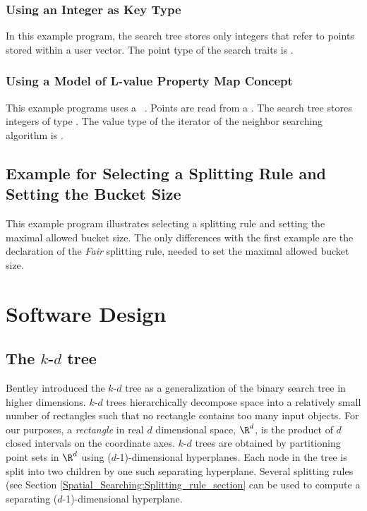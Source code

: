 \subsubsection{Using an Integer as Key Type}
In this example program, the search tree stores only integers that refer to points stored within a user vector.
The point type of the search traits is .


\subsubsection{Using a Model of L-value Property Map Concept}
This example programs uses a \boost\ .
Points are read from a . The search tree stores integers of type . The value type of the iterator of the neighbor searching algorithm is .



\newpage
\subsection{Example for Selecting a Splitting Rule and Setting the Bucket Size}

This example program illustrates selecting a splitting rule and
setting the maximal allowed bucket size.  The only differences with
the first example are the declaration of the {\em Fair} 
splitting rule, needed to set the maximal allowed bucket size.


\newpage

\section{Software Design}

\subsection{The $k$-$d$ tree\label{Kd_tree_subsection}}

Bentley \cite{b-mbstu-75} introduced the $k$-$d$ tree as a
generalization of the binary search tree in higher dimensions. $k$-$d$
trees hierarchically decompose space into a relatively small number of
rectangles such that no rectangle contains too many input objects.
For our purposes, a {\it rectangle} in real $d$ dimensional space,
$\R^d$, is the product of $d$ closed intervals on the coordinate axes.
$k$-$d$ trees are obtained by partitioning point sets in $\R^d$ using
($d$-1)-dimensional hyperplanes.  Each node in the tree is split into
two children by one such separating hyperplane.  Several splitting
rules (see Section \ref{Spatial_Searching:Splitting_rule_section} can
be used to compute a separating ($d$-1)-dimensional hyperplane.

